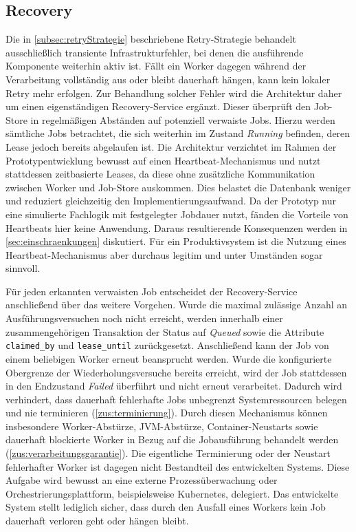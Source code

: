 \subsection{Recovery}
\label{subsec:recoveryarchitektur}
Die in \cref{subsec:retryStrategie} beschriebene Retry-Strategie behandelt ausschließlich transiente Infrastrukturfehler,
bei denen die ausführende Komponente weiterhin aktiv ist.
Fällt ein Worker dagegen während der Verarbeitung vollständig aus oder bleibt dauerhaft hängen, kann kein lokaler Retry mehr erfolgen.
Zur Behandlung solcher Fehler wird die Architektur daher um einen eigenständigen Recovery-Service ergänzt.
Dieser überprüft den Job-Store in regelmäßigen Abständen auf potenziell verwaiste Jobs.
Hierzu werden sämtliche Jobs betrachtet, die sich weiterhin im Zustand \textit{Running} befinden, deren Lease jedoch bereits abgelaufen ist.
Die Architektur verzichtet im Rahmen der Prototypentwicklung bewusst auf einen Heartbeat-Mechanismus und nutzt stattdessen
zeitbasierte Leases, da diese ohne zusätzliche Kommunikation zwischen Worker und Job-Store auskommen.
Dies belastet die Datenbank weniger und reduziert gleichzeitig den Implementierungsaufwand.
Da der Prototyp nur eine simulierte Fachlogik mit festgelegter Jobdauer nutzt, fänden die Vorteile von Heartbeats hier keine Anwendung.
Daraus resultierende Konsequenzen werden in \cref{sec:einschraenkungen} diskutiert.
Für ein Produktivsystem ist die Nutzung eines Heartbeat-Mechanismus aber durchaus legitim und unter Umständen sogar sinnvoll.

Für jeden erkannten verwaisten Job entscheidet der Recovery-Service anschließend über das weitere Vorgehen.
Wurde die maximal zulässige Anzahl an Ausführungsversuchen noch nicht erreicht, werden innerhalb einer zusammengehörigen
Transaktion der Status auf \textit{Queued} sowie die Attribute \texttt{claimed\_by} und \texttt{lease\_until} zurückgesetzt.
Anschließend kann der Job von einem beliebigen Worker erneut beansprucht werden.
Wurde die konfigurierte Obergrenze der Wiederholungsversuche bereits erreicht, wird der Job stattdessen in den
Endzustand \textit{Failed} überführt und nicht erneut verarbeitet.
Dadurch wird verhindert, dass dauerhaft fehlerhafte Jobs unbegrenzt Systemressourcen belegen und nie terminieren (\ref{zus:terminierung}).
Durch diesen Mechanismus können insbesondere Worker-Abstürze, JVM-Abstürze, Container-Neustarts sowie dauerhaft blockierte
Worker in Bezug auf die Jobausführung behandelt werden (\ref{zus:verarbeitungsgarantie}).
Die eigentliche Terminierung oder der Neustart fehlerhafter Worker ist dagegen nicht Bestandteil des entwickelten Systems.
Diese Aufgabe wird bewusst an eine externe Prozessüberwachung oder Orchestrierungsplattform, beispielsweise Kubernetes, delegiert.
Das entwickelte System stellt lediglich sicher, dass durch den Ausfall eines Workers kein Job dauerhaft verloren geht oder hängen bleibt.

